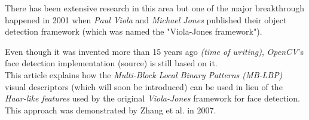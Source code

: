 \documentclass[10pt]{article}
\begin{document}
\begin{titlingpage}
    There has been extensive research in this area but one of the major
    breakthrough happened in 2001 when \emph{Paul Viola} and \emph{Michael
    Jones} published their object detection framework \cite{viola} (which was
    named the "Viola-Jones framework").

    Even though it was invented more than 15 years ago \emph{(time of writing)},
    \emph{OpenCV}'s face detection implementation (source) is still based on it.
    \\

    This article explains how the \emph{Multi-Block Local Binary Patterns
    (MB-LBP)} visual descriptors (which will soon be introduced) can be used in
    lieu of the \emph{Haar-like features} used by the original
    \emph{Viola-Jones} framework for face detection. This approach was
    demonstrated by Zhang et al. in 2007. \cite{Liao2007}
\end{titlingpage}

\tableofcontents


\nocite{*}

\printglossary
\clearpage
\printglossary[type=acronym,style=long]

\clearpage


{}
\end{document}
